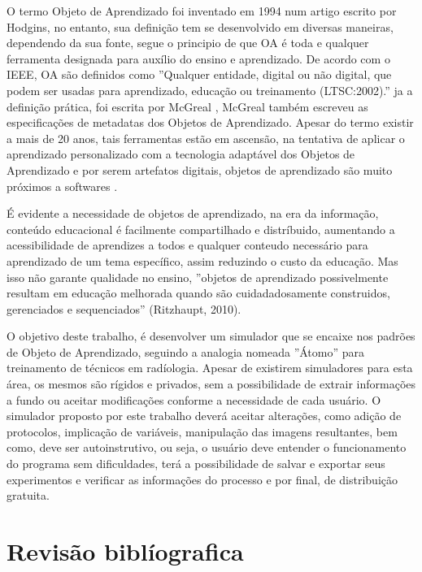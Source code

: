 \documentclass[12pt,openright,oneside,a4paper,english,french,spanish,brazil]{unifil}
\begin{document}
O termo Objeto de Aprendizado foi inventado em 1994 num artigo escrito por Hodgins, no entanto, sua definição tem se desenvolvido em diversas maneiras, dependendo da sua fonte, segue o principio de que OA é toda e qualquer ferramenta designada para auxílio do ensino e aprendizado. De acordo com o IEEE, OA são definidos como ''Qualquer entidade, digital ou não digital, que podem ser usadas para aprendizado, educação ou treinamento (LTSC:2002).'' ja a definição prática, foi escrita por McGreal \cite{McGreal:2003}, McGreal também escreveu as especificações de metadatas dos Objetos de Aprendizado. Apesar do termo existir a mais de 20 anos, tais ferramentas estão em ascensão, na tentativa de aplicar o aprendizado personalizado com a tecnologia adaptável dos Objetos de Aprendizado e por serem artefatos digitais, objetos de aprendizado são muito próximos a softwares \cite{Braga:2012}.
	
	É evidente a necessidade de objetos de aprendizado, na era da informação, conteúdo educacional é facilmente compartilhado e distríbuido, aumentando a acessibilidade de aprendizes a todos e qualquer conteudo necessário para aprendizado de um tema específico, assim reduzindo o custo da educação. Mas isso não garante qualidade no ensino, ''objetos de aprendizado possivelmente resultam em educação melhorada quando são cuidadadosamente construidos, gerenciados e sequenciados'' (Ritzhaupt, 2010).
	
	O objetivo deste trabalho, é desenvolver um simulador que se encaixe nos padrões de Objeto de Aprendizado, seguindo a analogia nomeada ''Átomo'' para treinamento de técnicos em radíologia. Apesar de existirem simuladores para esta área, os mesmos são rígidos e privados, sem a possibilidade de extrair informações a fundo ou aceitar modificações conforme a necessidade de cada usuário. O simulador proposto por este trabalho deverá aceitar alterações, como adição de protocolos, implicação de variáveis, manipulação das imagens resultantes, bem como, deve ser autoinstrutivo, ou seja, o usuário deve entender o funcionamento do programa sem dificuldades, terá a possibilidade de salvar e exportar seus experimentos e verificar as informações do processo e por final, de distribuição gratuita.

\chapter{Revisão biblíografica}%
\end{document}
